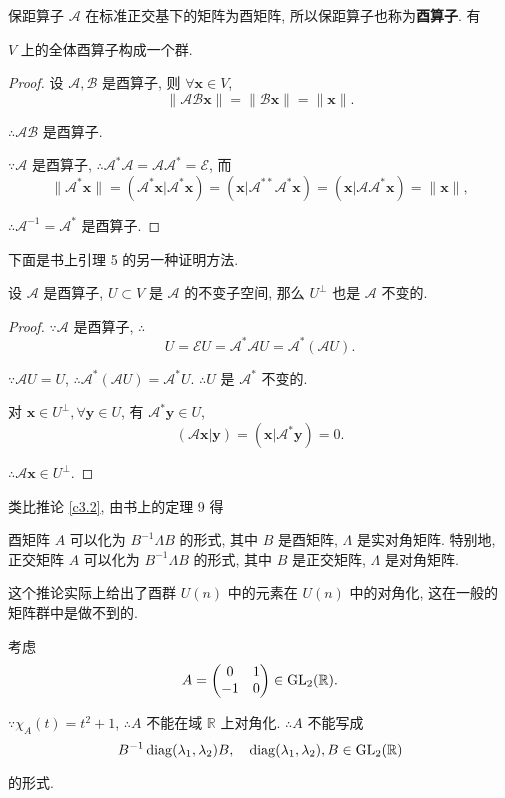\documentclass[color=black,device=normal,lang=cn,mode=geye]{elegantnote}
\begin{document}
保距算子 $\mathcal{A}$ 在标准正交基下的矩阵为酉矩阵, 所以保距算子也称为\textbf{酉算子}. 有
\begin{theorem}
    $V$ 上的全体酉算子构成一个群.
\end{theorem}
\begin{proof}
    设 $\mathcal{A},\mathcal{B}$ 是酉算子, 则 $\forall\boldsymbol{x}\in V$,
    \[\|\mathcal{AB}\boldsymbol{x}\|=\|\mathcal{B}\boldsymbol{x}\|=\|\boldsymbol{x}\|.\]

    $\therefore\mathcal{AB}$ 是酉算子.

    $\because\mathcal{A}$ 是酉算子, $\therefore\mathcal{A}^*\mathcal{A}=\mathcal{A}\mathcal{A}^*=\mathcal{E}$, 而
    \[\|\mathcal{A}^*\boldsymbol{x}\|=(\mathcal{A}^*\boldsymbol{x}|\mathcal{A}^*\boldsymbol{x})=(\boldsymbol{x}|\mathcal{A}^{**}\mathcal{A}^*\boldsymbol{x})=(\boldsymbol{x}|\mathcal{A}\mathcal{A}^*\boldsymbol{x})=\|\boldsymbol{x}\|,\]
    
    $\therefore\mathcal{A}^{-1}=\mathcal{A}^*$ 是酉算子.
\end{proof}
下面是书上引理 5 的另一种证明方法.
\begin{lemma}[书上的引理 5]\label{l3.1}
    设 $\mathcal{A}$ 是酉算子, $U\subset V$ 是 $\mathcal{A}$ 的不变子空间, 那么 $U^\perp$ 也是 $\mathcal{A}$ 不变的.
\end{lemma}
\begin{proof}
    $\because\mathcal{A}$ 是酉算子, $\therefore$
    \[U=\mathcal{E}U=\mathcal{A}^*\mathcal{A}U=\mathcal{A}^*(\mathcal{A}U).\]

    $\because\mathcal{A}U=U$, $\therefore\mathcal{A}^*(\mathcal{A}U)=\mathcal{A}^*U$. $\therefore U$ 是 $\mathcal{A}^*$ 不变的.

    对 $\boldsymbol{x}\in U^\perp,\forall\boldsymbol{y}\in U$, 有 $\mathcal{A}^*\boldsymbol{y}\in U$,
    \[(\mathcal{A}\boldsymbol{x}|\boldsymbol{y})=(\boldsymbol{x}|\mathcal{A}^*\boldsymbol{y})=0.\]

    $\therefore\mathcal{A}\boldsymbol{x}\in U^\perp$.
\end{proof}
类比推论 \ref{c3.2}, 由书上的定理 9 得
\begin{corollary}\label{c3.3}
    酉矩阵 $A$ 可以化为 $B^{-1}\Lambda B$ 的形式, 其中 $B$ 是酉矩阵, $\Lambda$ 是实对角矩阵. 特别地, 正交矩阵 $A$ 可以化为 $B^{-1}\Lambda B$ 的形式, 其中 $B$ 是正交矩阵, $\Lambda$ 是对角矩阵.
\end{corollary}
这个推论实际上给出了酉群 $U(n)$ 中的元素在 $U(n)$ 中的对角化, 这在一般的矩阵群中是做不到的.
\begin{example}
    考虑
    \[A=\begin{pmatrix}
        0 & 1 \\
        -1 & 0 \\
    \end{pmatrix}\in\operatorname{GL} _2(\mathbb{R}).\]
    
    $\because\chi_A(t)=t^2+1$, $\therefore A$ 不能在域 $\mathbb{R}$ 上对角化. $\therefore A$ 不能写成
    \[B^{-1}\operatorname{diag} (\lambda_1,\lambda_2)B,\quad \operatorname{diag} (\lambda_1,\lambda_2),B\in\operatorname{GL} _2(\mathbb{R})\]

    的形式.
\end{example}
\end{document}

